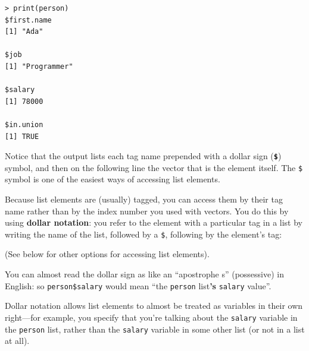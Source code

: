\documentclass[]{book}
\newenvironment{Shaded}{\begin{snugshade}}{\end{snugshade}}
\newcommand{\KeywordTok}[1]{\textcolor[rgb]{0.13,0.29,0.53}{\textbf{#1}}}
\newcommand{\DataTypeTok}[1]{\textcolor[rgb]{0.13,0.29,0.53}{#1}}
\newcommand{\DecValTok}[1]{\textcolor[rgb]{0.00,0.00,0.81}{#1}}
\newcommand{\StringTok}[1]{\textcolor[rgb]{0.31,0.60,0.02}{#1}}
\newcommand{\CommentTok}[1]{\textcolor[rgb]{0.56,0.35,0.01}{\textit{#1}}}
\newcommand{\OtherTok}[1]{\textcolor[rgb]{0.56,0.35,0.01}{#1}}
\newcommand{\OperatorTok}[1]{\textcolor[rgb]{0.81,0.36,0.00}{\textbf{#1}}}
\newcommand{\NormalTok}[1]{#1}
\theoremstyle{definition}
\theoremstyle{definition}
\theoremstyle{remark}
\begin{document}
\begin{verbatim}
> print(person)
$first.name
[1] "Ada"

$job
[1] "Programmer"

$salary
[1] 78000

$in.union
[1] TRUE
\end{verbatim}

Notice that the output lists each tag name prepended with a dollar sign
(\textbf{\texttt{\$}}) symbol, and then on the following line the vector
that is the element itself. The \texttt{\$} symbol is one of the easiest
ways of accessing list elements.

Because list elements are (usually) tagged, you can access them by their
tag name rather than by the index number you used with vectors. You do
this by using \textbf{dollar notation}: you refer to the element with a
particular tag in a list by writing the name of the list, followed by a
\texttt{\$}, following by the element's tag:

\begin{Shaded}
\end{Shaded}

(See below for other options for accessing list elements).

You can almost read the dollar sign as like an ``apostrophe s''
(possessive) in English: so \texttt{person\$salary} would mean ``the
\texttt{person} list\textbf{'s} \texttt{salary} value''.

Dollar notation allows list elements to almost be treated as variables
in their own right---for example, you specify that you're talking about
the \texttt{salary} variable in the \texttt{person} list, rather than
the \texttt{salary} variable in some other list (or not in a list at
all).
\end{document}

